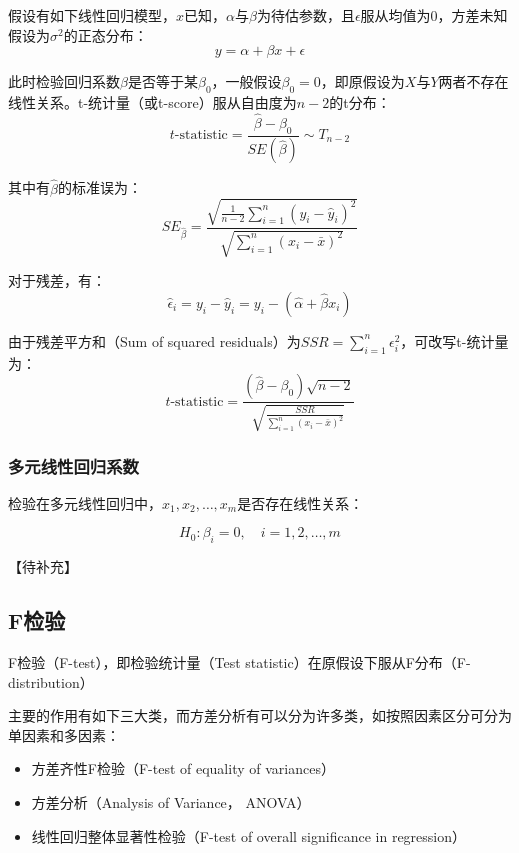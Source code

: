 \documentclass[11pt]{article}
\begin{document}
假设有如下线性回归模型，$x$已知，$\alpha$与$\beta$为待估参数，且$\epsilon$服从均值为0，方差未知假设为$\sigma^2$的正态分布：
\begin{equation*}
    y = \alpha + \beta x + \epsilon
\end{equation*}

此时检验回归系数$\beta$是否等于某$\beta_0$，一般假设$\beta_0 = 0$，即原假设为$X$与$Y$两者不存在线性关系。t-统计量（或t-score）服从自由度为$n-2$的t分布：
\begin{equation*}
    t\text{-statistic} = \frac{\hat{\beta} - \beta_0}{SE(\hat{\beta})} \sim T_{n-2}
\end{equation*}

其中有$\hat{\beta}$的标准误为：
\begin{equation*}
    SE_{\hat{\beta}} = \frac{\sqrt{\frac{1}{n-2} \sum_{i=1}^{n} (y_i - \hat{y}_i)^2}}{\sqrt{\sum_{i=1}^{n} (x_i - \bar{x})^2}}
\end{equation*}

对于残差，有：
\begin{equation*}
    \hat{\epsilon}_i = y_i - \hat{y}_i = y_i - (\hat{\alpha} + \hat{\beta} x_i )
\end{equation*}

由于残差平方和（Sum of squared residuals）为$SSR=\sum_{i=1}^n \epsilon_i^2$，可改写t-统计量为：
\begin{equation*}
    t\text{-statistic} = \frac{(\hat{\beta} - \beta_0)\sqrt{n-2}}{\sqrt{\frac{SSR}{\sum_{i=1}^{n} (x_i - \bar{x})^2}}}
\end{equation*}

\subsubsection{多元线性回归系数}

检验在多元线性回归中，$x_1,x_2,\dots,x_m$是否存在线性关系：

\begin{equation*}
    H_0: \beta_i = 0, \quad i=1,2,\dots,m
\end{equation*}

【待补充】

\subsection{F检验}

F检验（F-test），即检验统计量（Test statistic）在原假设下服从F分布（F-distribution）

主要的作用有如下三大类，而方差分析有可以分为许多类，如按照因素区分可分为单因素和多因素：
\begin{itemize}
    \item 方差齐性F检验（F-test of equality of variances）
    \item 方差分析（Analysis of Variance， ANOVA）
    \item 线性回归整体显著性检验（F-test of overall significance in regression）
\end{itemize}
\end{document}
